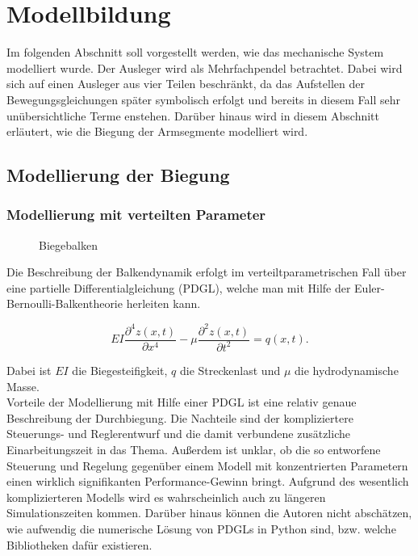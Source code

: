 \chapter{Modellbildung}
Im folgenden Abschnitt soll vorgestellt werden, wie das mechanische System modelliert wurde. 
Der Ausleger wird als Mehrfachpendel betrachtet. Dabei wird sich auf einen Ausleger aus vier Teilen beschränkt, da das Aufstellen der Bewegungsgleichungen später symbolisch erfolgt und bereits in diesem Fall sehr unübersichtliche Terme enstehen. Darüber hinaus wird in diesem Abschnitt erläutert, wie die Biegung der Armsegmente modelliert wird.

\section{Modellierung der Biegung}
\subsection{Modellierung mit verteilten Parameter}

\begin{figure}[h!]
\centering
\def\svgscale{0.8}

\caption{Biegebalken}
\label{fig:VertPara}
\end{figure}

Die Beschreibung der Balkendynamik erfolgt im verteiltparametrischen Fall über eine partielle Differentialgleichung (PDGL), welche man mit Hilfe der Euler-Bernoulli-Balkentheorie herleiten kann. 

\begin{equation}
EI\dfrac{\partial^4 z(x,t)}{\partial x^4}-\mu \dfrac{\partial^2 z(x,t)}{\partial t^2} = q(x,t).
\end{equation}

Dabei ist $EI$ die Biegesteifigkeit, $q$ die Streckenlast und $\mu$ die hydrodynamische Masse.\\
Vorteile der Modellierung mit Hilfe einer PDGL ist eine relativ genaue Beschreibung der Durchbiegung. Die Nachteile sind der kompliziertere Steuerungs- und Reglerentwurf und die damit verbundene zusätzliche Einarbeitungszeit in das Thema. Außerdem ist unklar, ob die so entworfene Steuerung und Regelung gegenüber einem Modell mit konzentrierten Parametern einen wirklich signifikanten Performance-Gewinn bringt. Aufgrund des wesentlich komplizierteren Modells wird es wahrscheinlich auch zu längeren Simulationszeiten kommen. Darüber hinaus können die Autoren nicht abschätzen, wie aufwendig die numerische Lösung von PDGLs in Python sind, bzw. welche Bibliotheken dafür existieren.



